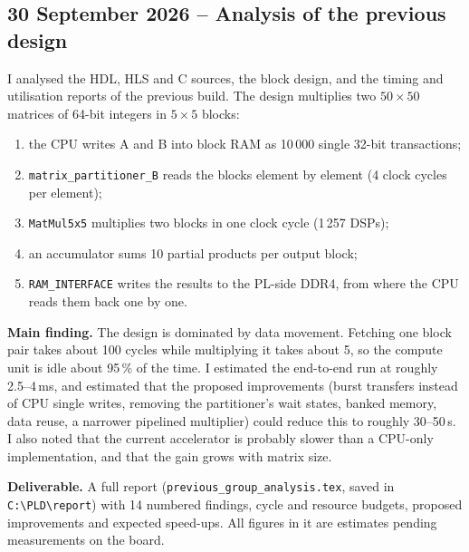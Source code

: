 \documentclass[11pt,a4paper]{article}
\newcommand{\code}[1]{\texttt{#1}}
\begin{document}
\subsection{30 September 2026 -- Analysis of the previous design}
I analysed the HDL, HLS and C sources, the block design, and the timing and utilisation reports of the previous build. The design multiplies two $50\times50$ matrices of 64-bit integers in $5\times5$ blocks:
\begin{enumerate}[noitemsep]
  \item the CPU writes A and B into block RAM as 10\,000 single 32-bit transactions;
  \item \code{matrix\_partitioner\_B} reads the blocks element by element (4 clock cycles per element);
  \item \code{MatMul5x5} multiplies two blocks in one clock cycle (1\,257 DSPs);
  \item an accumulator sums 10 partial products per output block;
  \item \code{RAM\_INTERFACE} writes the results to the PL-side DDR4, from where the CPU reads them back one by one.
\end{enumerate}

\textbf{Main finding.} The design is dominated by data movement. Fetching one block pair takes about 100 cycles while multiplying it takes about 5, so the compute unit is idle about 95\,\% of the time. I estimated the end-to-end run at roughly 2.5--4\,ms, and estimated that the proposed improvements (burst transfers instead of CPU single writes, removing the partitioner's wait states, banked memory, data reuse, a narrower pipelined multiplier) could reduce this to roughly 30--50\,\textmu s. I also noted that the current accelerator is probably slower than a CPU-only implementation, and that the gain grows with matrix size.

\textbf{Deliverable.} A full report (\code{previous\_group\_analysis.tex}, saved in \code{C:\textbackslash PLD\textbackslash report}) with 14 numbered findings, cycle and resource budgets, proposed improvements and expected speed-ups. All figures in it are estimates pending measurements on the board.

\end{document}
